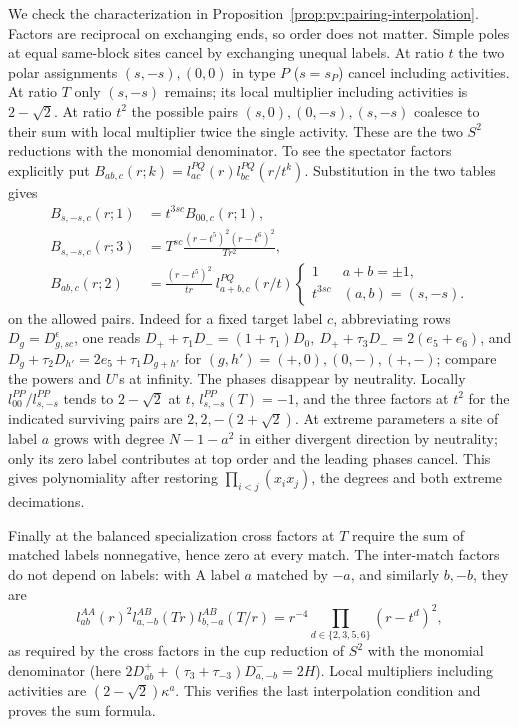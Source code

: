We check the characterization in Proposition~\ref{prop:pv:pairing-interpolation}. Factors are reciprocal on exchanging ends, so order does not matter. Simple poles at equal same-block sites cancel by exchanging unequal labels. At ratio \(t\) the two polar assignments \((s,-s),(0,0)\) in type \(P\) (\(s=s_P\)) cancel including activities. At ratio \(T\) only \((s,-s)\) remains; its local multiplier including activities is \(2-\sqrt2\). At ratio \(t^2\) the possible pairs \((s,0),(0,-s),(s,-s)\) coalesce to their sum with local multiplier twice the single activity. These are the two \(S^2\) reductions with the monomial denominator. To see the spectator factors explicitly put \(B_{ab,c}(r;k)=l^{PQ}_{ac}(r)l^{PQ}_{bc}(r/t^k)\). Substitution in the two tables gives
\[
 \begin{split}
 B_{s,-s,c}(r;1)&=t^{3s c}B_{00,c}(r;1),\\
 B_{s,-s,c}(r;3)&=T^{s c}\frac{(r-t^5)^2(r-t^6)^2}{T r^2},\\
 B_{ab,c}(r;2)&=\frac{(r-t^5)^2}{tr}\ l^{PQ}_{a+b,c}(r/t)
 \begin{cases}1&a+b=\pm1,\\t^{3s c}&(a,b)=(s,-s).\end{cases}
 \end{split}
\]
on the allowed pairs. Indeed for a fixed target label \(c\), abbreviating rows \(D_g=D^\epsilon_{g,sc}\), one reads
\(D_++\tau_1D_-=(1+\tau_1)D_0,\ D_++\tau_3D_-=2(e_5+e_6)\), and \(D_g+\tau_2D_{h'}=2e_5+\tau_1D_{g+h'}\) for \( (g,h')=(+,0),(0,-),(+,-)\); compare the powers and \(U\)'s at infinity. The phases disappear by neutrality. Locally \(l^{PP}_{00}/l^{PP}_{s,-s}\) tends to \(2-\sqrt2\) at \(t\), \(l^{PP}_{s,-s}(T)=-1\), and the three factors at \(t^2\) for the indicated surviving pairs are \(2,2,-(2+\sqrt2)\). At extreme parameters a site of label \(a\) grows with degree \(N-1-a^2\) in either divergent direction by neutrality; only its zero label contributes at top order and the leading phases cancel. This gives polynomiality after restoring \(\prod_{i<j}(x_i x_j)\), the degrees and both extreme decimations.

Finally at the balanced specialization cross factors at \(T\) require the sum of matched labels nonnegative, hence zero at every match. The inter-match factors do not depend on labels: with A label \(a\) matched by \(-a\), and similarly \(b,-b\), they are
\[
 l^{AA}_{ab}(r)^2 l^{AB}_{a,-b}(Tr) l^{AB}_{b,-a}(T/r)
 =r^{-4}\prod_{d\in\{2,3,5,6\}}(r-t^d)^2 ,
\]
as required by the cross factors in the cup reduction of \(S^2\) with the monomial denominator (here \(2D^+_{ab}+(\tau_3+\tau_{-3})D^-_{a,-b}=2H\)). Local multipliers including activities are \((2-\sqrt2)\kappa^a\). This verifies the last interpolation condition and proves the sum formula.

